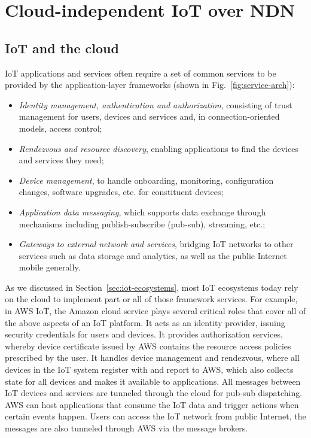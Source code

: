 \section{Cloud-independent IoT over NDN}
\label{sec:ndn-iot}

\subsection{IoT and the cloud}
\label{sec:cloud-iot}

IoT applications and services often require a set of common services to be provided by the application-layer frameworks (shown in Fig.~\ref{fig:service-arch}):
\begin{itemize}
\item \emph{Identity management, authentication and authorization}, consisting of trust management for users, devices and services and, in connection-oriented models, access control;
\item \emph{Rendezvous and resource discovery}, enabling applications to find the devices and services they need;
\item \emph{Device management}, to handle onboarding, monitoring, configuration changes, software upgrades, etc. for constituent devices;
\item \emph{Application data messaging}, which supports data exchange through mechanisms including publish-subscribe (pub-sub), streaming, etc.;
\item \emph{Gateways to external network and services}, bridging IoT networks to other services such as data storage and analytics, as well as the public Internet mobile generally.
\end{itemize}

As we discussed in Section~\ref{sec:iot-ecosystems}, most IoT ecosystems today rely on the cloud to implement part or all of those framework services.
For example, in AWS IoT, the Amazon cloud service plays several critical roles that cover all of the above aspects of an IoT platform.
It acts as an identity provider, issuing security credentials for users and devices.  It provides authorization services, whereby device certificate issued by AWS contains the resource access policies prescribed by the user. It handles device management and rendezvous, where all devices in the IoT system register with and report to AWS, which also collects state for all devices and makes it available to applications.  All messages between IoT devices and services are tunneled through the cloud for pub-sub dispatching. AWS can host applications that consume the IoT data and trigger actions when certain events happen. Users can access the IoT network from public Internet, the messages are also tunneled through AWS via the message brokers.  

